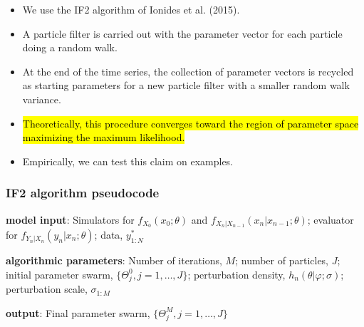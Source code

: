 \documentclass[]{article}
\begin{document}
\begin{itemize}
\item
  We use the IF2 algorithm of Ionides et al. (2015).
\item
  A particle filter is carried out with the parameter vector for each
  particle doing a random walk.
\item
  At the end of the time series, the collection of parameter vectors is
  recycled as starting parameters for a new particle filter with a
  smaller random walk variance.
\item
  \hl{Theoretically, this procedure converges toward the region of parameter
  space maximizing the maximum likelihood.}
\item
  Empirically, we can test this claim on examples.
\end{itemize}

\subsubsection{IF2 algorithm pseudocode}\label{if2-algorithm-pseudocode}

\textbf{model input}: Simulators for \(f_{X_0}(x_0;\theta)\) and
\(f_{X_n|X_{n-1}}(x_n| x_{n-1}; \theta)\); evaluator for
\(f_{Y_n|X_n}(y_n| x_n;\theta)\); data, \(y^*_{1:N}\)

\textbf{algorithmic parameters}: Number of iterations, \(M\); number of
particles, \(J\); initial parameter swarm,
\(\{\Theta^0_j, j=1,\dots,J\}\); perturbation density,
\(h_n(\theta|\varphi;\sigma)\); perturbation scale, \(\sigma_{1{:}M}\)

\textbf{output}: Final parameter swarm, \(\{\Theta^M_j, j=1,\dots,J\}\)
\end{document}

